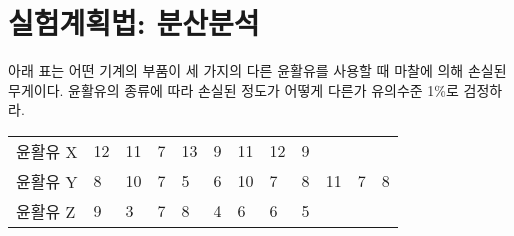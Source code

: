 \section{실험계획법: 분산분석}
아래 표는 어떤 기계의 부품이 세 가지의 다른 윤활유를 사용할 때 마찰에
의해 손실된 무게이다. 윤활유의 종류에 따라 손실된 정도가 어떻게 다른가
유의수준 1\%로 검정하라.

\begin{tabularx}{0.9\textwidth}{ l|XXXXXXXXXXX }
  \noalign{\smallskip}\hline\noalign{\smallskip}
  윤활유 X & 12 & 11 & 7 & 13 & 9 & 11 & 12 & 9 \\
  윤활유 Y & 8 & 10 & 7 & 5 & 6 & 10 & 7 & 8 & 11 & 7 & 8\\
  윤활유 Z & 9 & 3 & 7 & 8 & 4 & 6 & 6 & 5
\end{tabularx}

